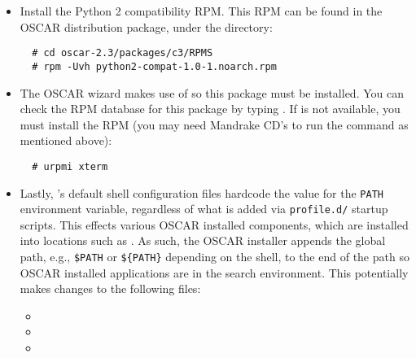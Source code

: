 \begin{itemize}
\item Install the Python 2 compatibility RPM.  This RPM can be found
  in the OSCAR distribution package, under the 
  directory:

\begin{verbatim}
  # cd oscar-2.3/packages/c3/RPMS
  # rpm -Uvh python2-compat-1.0-1.noarch.rpm
\end{verbatim}

\item The OSCAR wizard makes use of  so this package must be
  installed.  You can check the RPM database for this package by typing
  .  If  is not available, you must
  install the  RPM (you may need Mandrake 
  CD's to run the  command as mentioned above):

\begin{verbatim}
  # urpmi xterm
\end{verbatim}

\item Lastly, 's default shell configuration files hardcode the
  value for the {\tt PATH} environment variable, regardless of what is
  added via {\tt profile.d/} startup scripts.  This effects various
  OSCAR installed components, which are installed into locations such
  as .  As such, the OSCAR installer appends the global path,
  e.g., {\tt \$PATH} or {\tt \$\{PATH\}} depending on the shell, to the end
  of the path so OSCAR installed applications are in the search
  environment.  This potentially makes changes to the following files:

  \begin{itemize}
  \item {}
  \item {}
  \item {}
  \end{itemize}

\end{itemize}



